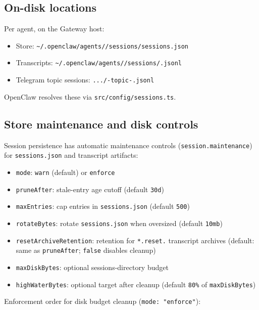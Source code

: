 \hrulefill


\subsection{On-disk locations}


Per agent, on the Gateway host:

\begin{itemize}
  \item Store: \texttt{\textasciitilde{}/.openclaw/agents//sessions/sessions.json}
  \item Transcripts: \texttt{\textasciitilde{}/.openclaw/agents//sessions/.jsonl}
  \item Telegram topic sessions: \texttt{.../-topic-.jsonl}
\end{itemize}


OpenClaw resolves these via \texttt{src/config/sessions.ts}.

\hrulefill


\subsection{Store maintenance and disk controls}


Session persistence has automatic maintenance controls (\texttt{session.maintenance}) for \texttt{sessions.json} and transcript artifacts:

\begin{itemize}
  \item \texttt{mode}: \texttt{warn} (default) or \texttt{enforce}
  \item \texttt{pruneAfter}: stale-entry age cutoff (default \texttt{30d})
  \item \texttt{maxEntries}: cap entries in \texttt{sessions.json} (default \texttt{500})
  \item \texttt{rotateBytes}: rotate \texttt{sessions.json} when oversized (default \texttt{10mb})
  \item \texttt{resetArchiveRetention}: retention for \texttt{*.reset.} transcript archives (default: same as \texttt{pruneAfter}; \texttt{false} disables cleanup)
  \item \texttt{maxDiskBytes}: optional sessions-directory budget
  \item \texttt{highWaterBytes}: optional target after cleanup (default \texttt{80\%} of \texttt{maxDiskBytes})
\end{itemize}


Enforcement order for disk budget cleanup (\texttt{mode: "enforce"}):

